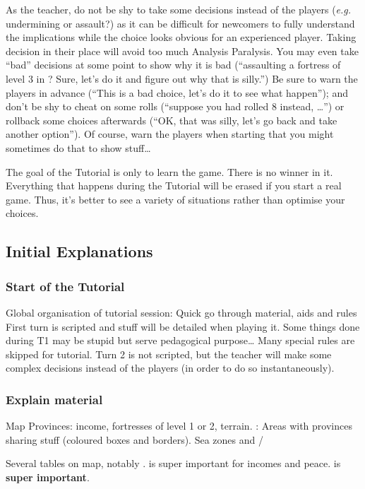 As the teacher, do not be shy to take some decisions instead of the players
(\emph{e.g.} undermining or assault?) as it can be difficult for newcomers to
fully understand the implications while the choice looks obvious for an
experienced player. Taking decision in their place will avoid too much
Analysis Paralysis. You may even take ``bad'' decisions at some point to show
why it is bad (``assaulting a fortress of level 3 in \TMED? Sure, let's do it
and figure out why that is silly.'') Be sure to warn the players in advance
(``This is a bad choice, let's do it to see what happen''); and don't be shy
to cheat on some rolls (``suppose you had rolled 8 instead, \ldots'') or
rollback some choices afterwards (``OK, that was silly, let's go back and take
another option''). Of course, warn the players when starting that you might
sometimes do that to show stuff\ldots

The goal of the Tutorial is only to learn the game. There is no winner in
it. Everything that happens during the Tutorial will be erased if you start a
real game. Thus, it's better to see a variety of situations rather than
optimise your choices.

\subsection{Initial Explanations}
\subsubsection{Start of the Tutorial}
\aparag Global organisation of tutorial session:
\bparag Quick go through material, aids and rules
\bparag First turn is scripted and stuff will be detailed when playing it.
\bparag Some things done during T1 may be stupid but serve pedagogical
purpose\ldots
\bparag Many special rules are skipped for tutorial.
\bparag Turn 2 is not scripted, but the teacher will make some complex
decisions instead of the players (in order to do so instantaneously).

\subsubsection{Explain material}
\aparag Map
\bparag Provinces: income, fortresses of level 1 or 2, terrain.
\bparag \ROTW: Areas with provinces sharing stuff (coloured boxes and
borders).
\bparag Sea zones and \CTZ/\STZ

\aparag \STAB
\bparag Several tables on \ROTW map, notably \STAB.
\bparag \STAB is super important for incomes and peace.
\bparag \STAB is \textbf{super important}.

